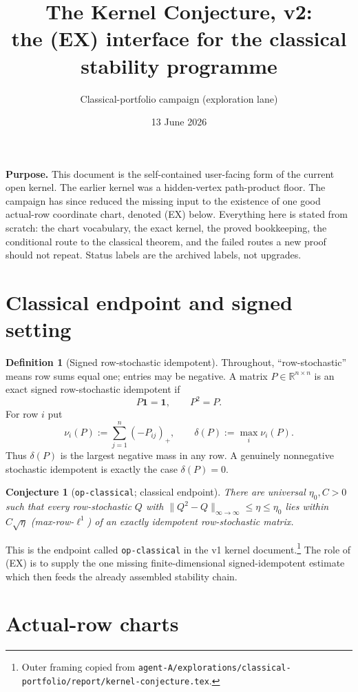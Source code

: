 \documentclass[11pt]{article}
\title{The Kernel Conjecture, v2:\\
the \textup{(EX)} interface for the classical stability programme}
\author{Classical-portfolio campaign (exploration lane)}
\date{13 June 2026}
\theoremstyle{plain}
\newtheorem{conjecture}{Conjecture}
\theoremstyle{definition}
\newtheorem{definition}{Definition}
\theoremstyle{remark}
\newcommand{\one}{\mathbf 1}
\newcommand{\R}{\mathbb R}
\begin{document}
\maketitle

\noindent\textbf{Purpose.} This document is the self-contained user-facing
form of the current open kernel.  The earlier kernel was a hidden-vertex
path-product floor.  The campaign has since reduced the missing input to the
existence of one good actual-row coordinate chart, denoted \textup{(EX)} below.
Everything here is stated from scratch: the chart vocabulary, the exact
kernel, the proved bookkeeping, the conditional route to the classical theorem,
and the failed routes a new proof should not repeat.  Status labels are the
archived labels, not upgrades.

\section{Classical endpoint and signed setting}

\begin{definition}[Signed row-stochastic idempotent]\label{def:rowstoch}
Throughout, ``row-stochastic'' means row sums equal one; entries may be
negative.  A matrix $P\in\R^{n\times n}$ is an exact signed row-stochastic
idempotent if
\[
P\one=\one,\qquad P^2=P .
\]
For row $i$ put
\[
\nu_i(P):=\sum_{j=1}^n(-P_{ij})_+,\qquad
\delta(P):=\max_i\nu_i(P).
\]
Thus $\delta(P)$ is the largest negative mass in any row.  A genuinely
nonnegative stochastic idempotent is exactly the case $\delta(P)=0$.
\end{definition}

\begin{conjecture}[\texttt{op-classical}; classical endpoint]\label{conj:opclassical}
There are universal $\eta_0,C>0$ such that every row-stochastic $Q$ with
$\|Q^2-Q\|_{\infty\to\infty}\le\eta\le\eta_0$ lies within $C\sqrt{\eta}$
(max-row-$\ell^1$) of an exactly idempotent row-stochastic matrix.
\end{conjecture}

\noindent This is the endpoint called \texttt{op-classical} in the v1 kernel
document.\footnote{Outer framing copied from
\texttt{agent-A/explorations/classical-portfolio/report/kernel-conjecture.tex}.}
The role of \textup{(EX)} is to supply the one missing finite-dimensional
signed-idempotent estimate which then feeds the already assembled stability
chain.

\section{Actual-row charts}
\end{document}

